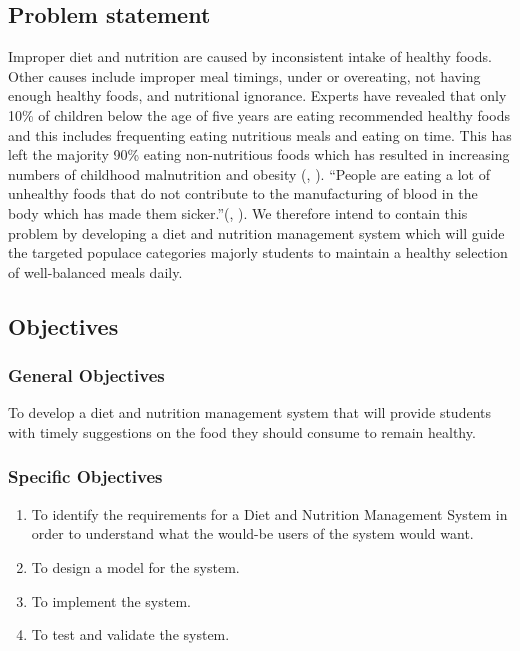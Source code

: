 \documentclass {article}
\begin{document}
\subsection{Problem statement}
\noindent Improper diet and nutrition are caused by inconsistent intake of healthy foods. Other causes include improper meal timings, under or overeating, not having enough healthy foods, and nutritional ignorance. Experts have revealed that only 10\% of children below the age of five years are eating recommended healthy foods and this includes frequenting eating nutritious meals and eating on time. This has left the majority 90\% eating non-nutritious foods which has resulted in increasing numbers of childhood malnutrition and obesity (\citeauthor{tumwine2022only}, \citeyear{tumwine2022only}). “People are eating a lot of unhealthy foods that do not contribute to the manufacturing of blood in the body which has made them sicker.”(\citeauthor{tumwine2022only}, \citeyear{tumwine2022only}). We therefore intend to contain this problem by developing a diet and nutrition management system which will guide the targeted populace categories majorly students to maintain a healthy selection of well-balanced meals daily.

\subsection{Objectives}
\subsubsection{General Objectives}

\noindent To develop a diet and nutrition management system that will provide students with timely suggestions on the food they should consume to remain healthy. 

\subsubsection{Specific Objectives}

\begin{enumerate}
    \item To identify the requirements for a Diet and Nutrition Management System in order to understand what the would-be users of the system would want.
    \item To design a model for the system.
    \item To implement the system.
    \item To test and validate the system. 
\end{enumerate}
\end{document}
